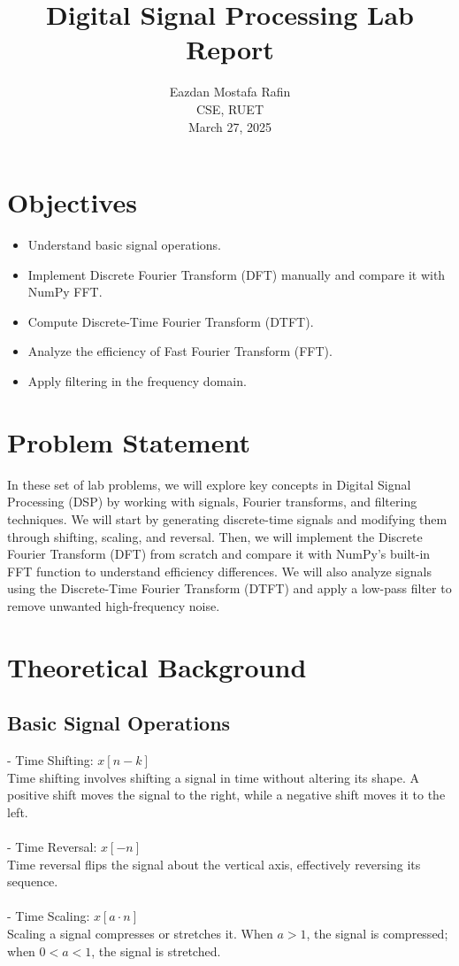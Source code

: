 \documentclass[a4paper,12pt]{article}
\title{\textbf{Digital Signal Processing Lab Report}}
\author{Eazdan Mostafa Rafin \\ CSE, RUET \\ March 27, 2025}
\date{}
\begin{document}
\maketitle

\section*{Objectives}
\begin{itemize}
    \item Understand basic signal operations.
    \item Implement Discrete Fourier Transform (DFT) manually and compare it with NumPy FFT.
    \item Compute Discrete-Time Fourier Transform (DTFT).
    \item Analyze the efficiency of Fast Fourier Transform (FFT).
    \item Apply filtering in the frequency domain.
\end{itemize}

\section*{Problem Statement}
In these set of lab problems, we will explore key concepts in Digital Signal Processing (DSP) by working with signals, Fourier transforms, and filtering techniques. We will start by generating discrete-time signals and modifying them through shifting, scaling, and reversal. Then, we will implement the Discrete Fourier Transform (DFT) from scratch and compare it with NumPy’s built-in FFT function to understand efficiency differences. We will also analyze signals using the Discrete-Time Fourier Transform (DTFT) and apply a low-pass filter to remove unwanted high-frequency noise.

\section*{Theoretical Background}
\subsection*{Basic Signal Operations}
- Time Shifting: $x[n - k]$  \\ 
  Time shifting involves shifting a signal in time without altering its shape. A positive shift moves the signal to the right, while a negative shift moves it to the left. \\
  \\
- Time Reversal: $x[-n]$ \\
  Time reversal flips the signal about the vertical axis, effectively reversing its sequence.\\
  \\
- Time Scaling: $x[a \cdot n]$ \\
  Scaling a signal compresses or stretches it. When $a > 1$, the signal is compressed; when $0 < a < 1$, the signal is stretched.
\end{document}
